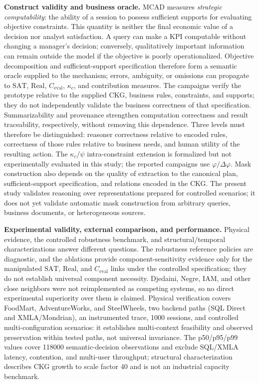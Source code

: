 \documentclass[journal]{IEEEtran}
\begin{document}
\textbf{Construct validity and business oracle.} MCAD measures \emph{strategic computability}: the ability of a session to possess sufficient supports for evaluating objective constraints. This quantity is neither the final economic value of a decision nor analyst satisfaction. A query can make a KPI computable without changing a manager's decision; conversely, qualitatively important information can remain outside the model if the objective is poorly operationalized. Objective decomposition and sufficient-support specification therefore form a semantic oracle supplied to the mechanism; errors, ambiguity, or omissions can propagate to $\mathrm{SAT}$, $\mathrm{Real}$, $C_{\mathrm{eval}}$, $\kappa_c$, and contribution measures. The campaigns verify the prototype relative to the supplied CKG, business rules, constraints, and supports; they do not independently validate the business correctness of that specification. Summarizability and provenance strengthen computation correctness and result traceability, respectively, without removing this dependence. Three levels must therefore be distinguished: reasoner correctness relative to encoded rules, correctness of those rules relative to business needs, and human utility of the resulting action. The $\kappa_c/\psi$ intra-constraint extension is formalized but not experimentally evaluated in this study; the reported campaigns use $\varphi/\Delta\varphi$. Mask construction also depends on the quality of extraction to the canonical plan, sufficient-support specification, and relations encoded in the CKG. The present study validates reasoning over representations prepared for controlled scenarios; it does not yet validate automatic mask construction from arbitrary queries, business documents, or heterogeneous sources.

\textbf{Experimental validity, external comparison, and performance.} Physical evidence, the controlled robustness benchmark, and structural/temporal characterizations answer different questions. The robustness reference policies are diagnostic, and the ablations provide component-sensitivity evidence only for the manipulated $\mathrm{SAT}$, $\mathrm{Real}$, and $C_{\mathrm{eval}}$ links under the controlled specification; they do not establish universal component necessity. Djedaini, Negre, IAM, and other close neighbors were not reimplemented as competing systems, so no direct experimental superiority over them is claimed. Physical verification covers FoodMart, AdventureWorks, and SteelWheels, two backend paths (SQL Direct and XMLA/Mondrian), an instrumented trace, 1000 sessions, and controlled multi-configuration scenarios: it establishes multi-context feasibility and observed preservation within tested paths, not universal invariance. The p50/p95/p99 values cover 118000 semantic-decision observations and exclude SQL/XMLA latency, contention, and multi-user throughput; structural characterization describes CKG growth to scale factor 40 and is not an industrial capacity benchmark.
\end{document}
